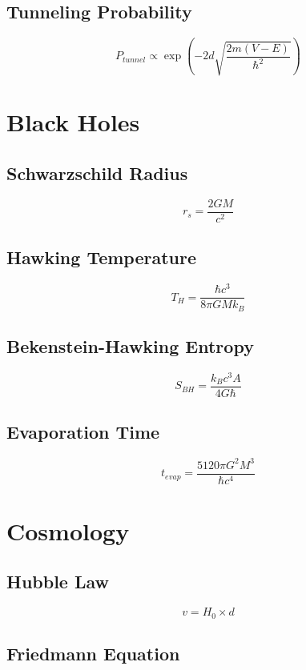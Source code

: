\documentclass[
  11pt,
  letterpaper,
  twoside,
  openright]{book}
\begin{document}
\subsection{Tunneling Probability}\label{tunneling-probability}

\[
P_{tunnel} \propto \exp\left(-2d\sqrt{\frac{2m(V-E)}{\hbar^2}}\right)
\]

\section{Black Holes}\label{black-holes-1}

\subsection{Schwarzschild Radius}\label{schwarzschild-radius}

\[
r_s = \frac{2GM}{c^2}
\]

\subsection{Hawking Temperature}\label{hawking-temperature-1}

\[
T_H = \frac{\hbar c^3}{8\pi G M k_B}
\]

\subsection{Bekenstein-Hawking
Entropy}\label{bekenstein-hawking-entropy-1}

\[
S_{BH} = \frac{k_B c^3 A}{4 G \hbar}
\]

\subsection{Evaporation Time}\label{evaporation-time}

\[
t_{evap} = \frac{5120 \pi G^2 M^3}{\hbar c^4}
\]

\section{Cosmology}\label{cosmology-1}

\subsection{Hubble Law}\label{hubble-law}

\[
v = H_0 \times d
\]

\subsection{Friedmann Equation}\label{friedmann-equation}
\end{document}
